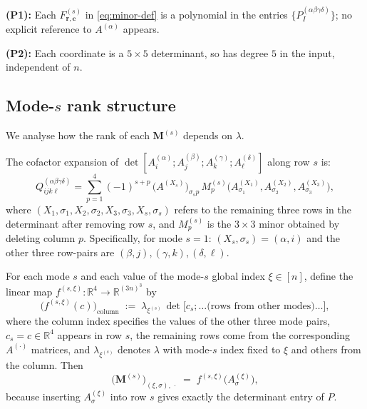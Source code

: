 \documentclass[12pt]{article}
\theoremstyle{definition}
\newcommand{\bR}{\mathbb{R}}
\begin{document}
\textbf{(P1):} Each $F^{(s)}_{\mathbf{r},\mathbf{c}}$ in \eqref{eq:minor-def} is a polynomial
in the entries $\{P^{(\alpha\beta\gamma\delta)}_I\}$; no explicit reference to $A^{(\alpha)}$
appears.

\textbf{(P2):} Each coordinate is a $5\times5$ determinant, so has degree $5$ in the input,
independent of $n$.

\subsection{Mode-\texorpdfstring{$s$}{s} rank structure}

We analyse how the rank of each $\mathbf{M}^{(s)}$ depends on $\lambda$.

The cofactor expansion of $\det[A^{(\alpha)}_i;A^{(\beta)}_j;A^{(\gamma)}_k;A^{(\delta)}_\ell]$
along row $s$ is:
\begin{equation}\label{eq:cofactor-s}
  Q^{(\alpha\beta\gamma\delta)}_{ijk\ell}
  = \sum_{p=1}^{4}(-1)^{s+p}\,\bigl(A^{(X_s)}\bigr)_{\sigma_s p}\,
    M^{(s)}_p\!\bigl(A^{(X_1)}_{\sigma_1},A^{(X_2)}_{\sigma_2},A^{(X_3)}_{\sigma_3}\bigr),
\end{equation}
where $(X_1,\sigma_1,X_2,\sigma_2,X_3,\sigma_3,X_s,\sigma_s)$ refers to the remaining three rows
in the determinant after removing row $s$, and $M^{(s)}_p$ is the $3\times3$ minor obtained by
deleting column $p$.  Specifically, for mode $s=1$:
$(X_s,\sigma_s)=(\alpha,i)$ and the other three row-pairs are $(\beta,j),(\gamma,k),(\delta,\ell)$.

For each mode $s$ and each value of the mode-$s$ global index $\xi\in[n]$, define the
linear map $f^{(s,\xi)}:\bR^4\to\bR^{(3n)^3}$ by
\begin{equation}\label{eq:f-def-s}
  \bigl(f^{(s,\xi)}(c)\bigr)_{\text{column}}
  \;:=\;
  \lambda_{\xi^{(s)}}\,\det\!\bigl[c_s;\ldots\text{(rows from other modes)}\ldots\bigr],
\end{equation}
where the column index specifies the values of the other three mode pairs, $c_s=c\in\bR^4$
appears in row $s$, the remaining rows come from the corresponding $A^{(\cdot)}$ matrices,
and $\lambda_{\xi^{(s)}}$ denotes $\lambda$ with mode-$s$ index fixed to $\xi$ and others
from the column.  Then
\begin{equation}\label{eq:row-s}
  \bigl(\mathbf{M}^{(s)}\bigr)_{(\xi,\sigma),\,\cdot}
  \;=\; f^{(s,\xi)}\!\bigl(A^{(\xi)}_\sigma\bigr),
\end{equation}
because inserting $A^{(\xi)}_\sigma$ into row $s$ gives exactly the determinant entry of $P$.
\end{document}

